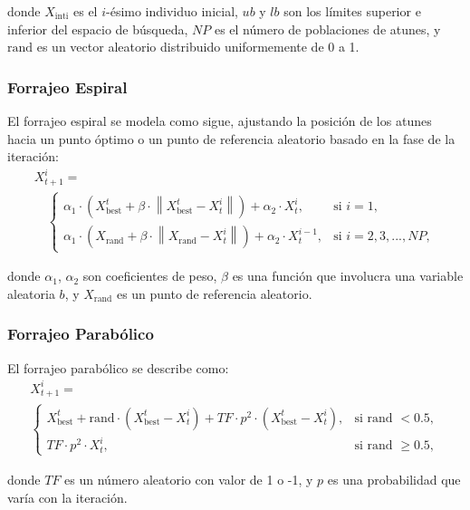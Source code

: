 \documentclass[conference]{IEEEtran}
\begin{document}
donde $X_{\text{inti}}$ es el $i$-ésimo individuo inicial, $ub$ y $lb$ son los límites superior e inferior del espacio de búsqueda, $NP$ es el número de poblaciones de atunes, y $\text{rand}$ es un vector aleatorio distribuido uniformemente de 0 a 1.

\subsubsection{Forrajeo Espiral}
El forrajeo espiral se modela como sigue, ajustando la posición de los atunes hacia un punto óptimo o un punto de referencia aleatorio basado en la fase de la iteración:
\begin{equation}
	\begin{gathered}
		X_{t+1}^i = \\
		\quad
		\begin{cases}
			\alpha_1 \cdot \left(X_{\text{best}}^t + \beta \cdot \left\lVert X_{\text{best}}^t - X_t^i \right\rVert \right) + \alpha_2 \cdot X_t^i, & \text{si } i = 1,\\
			\alpha_1 \cdot \left(X_{\text{rand}} + \beta \cdot \left\lVert X_{\text{rand}} - X_t^i \right\rVert \right) + \alpha_2 \cdot X_t^{i-1}, & \text{si } i = 2,3,...,NP,
		\end{cases}
	\end{gathered}
\end{equation}


donde $\alpha_1$, $\alpha_2$ son coeficientes de peso, $\beta$ es una función que involucra una variable aleatoria $b$, y $X_{\text{rand}}$ es un punto de referencia aleatorio.

\subsubsection{Forrajeo Parabólico}
El forrajeo parabólico se describe como:
\begin{equation}
	\begin{gathered}
		X_{t+1}^i = \\
		\begin{cases}
			X_{\text{best}}^t + \text{rand} \cdot (X_{\text{best}}^t - X_t^i) + TF \cdot p^2 \cdot (X_{\text{best}}^t - X_t^i), & \text{si rand } < 0.5,\\
			TF \cdot p^2 \cdot X_t^i, & \text{si rand } \geq 0.5,
		\end{cases}
	\end{gathered}
\end{equation}

\noindent donde $TF$ es un número aleatorio con valor de 1 o -1, y $p$ es una probabilidad que varía con la iteración.
\end{document}
